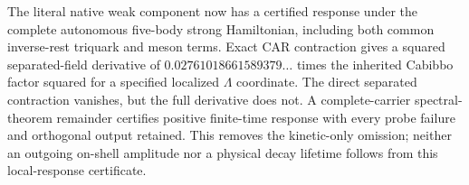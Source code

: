 The literal native weak component now has a certified response under the
complete autonomous five-body strong Hamiltonian, including both common
inverse-rest triquark and meson terms. Exact CAR contraction gives a squared
separated-field derivative of $0.02761018661589379\ldots$ times the inherited
Cabibbo factor squared for a specified localized $\Lambda$ coordinate.
The direct separated contraction vanishes, but the full derivative does not.
A complete-carrier spectral-theorem remainder certifies positive finite-time
response with every probe failure and orthogonal output retained. This removes
the kinetic-only omission; neither an outgoing on-shell amplitude nor a
physical decay lifetime follows from this local-response certificate.
